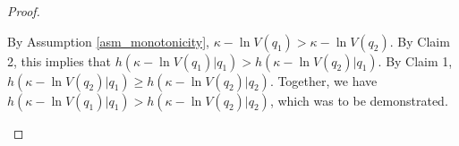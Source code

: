 \begin{proof}
\begin{enumerate}[label=(\roman*)]
By Assumption \ref{asm_monotonicity}, $\kappa - \ln V(q_1) > \kappa - \ln V(q_2)$. By Claim 2, this implies that $h(\kappa - \ln V(q_1)|q_1) > h(\kappa-\ln V(q_2)|q_1)$. By Claim 1, $h(\kappa-\ln V(q_2) | q_1) \geq h(\kappa-\ln V(q_2) | q_2)$. Together, we have $h(\kappa - \ln V(q_1)|q_1) > h(\kappa - \ln V(q_2)|q_2)$, which was to be demonstrated. 
\end{enumerate}
\end{proof}


